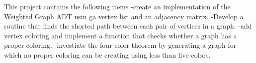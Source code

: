 This project contains the following items -\/create an implementation of the Weighted Graph A\+DT usin ga vertex list and an adjacency matrix. -\/\+Develop a routine that finds the shorted path between each pair of vertices in a graph. -\/add vertex coloring and implement a function that checks whether a graph has a proper coloring. -\/investiate the four color theorem by generating a graph for which no proper coloring can be creating using less than five colors. 